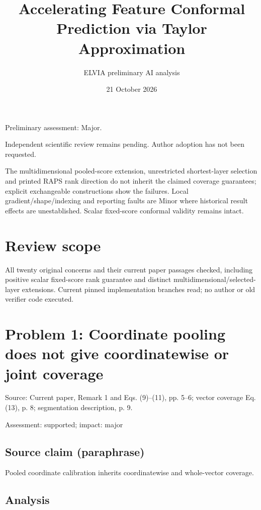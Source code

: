 \documentclass[11pt]{article}
\begin{document}
\title{Accelerating Feature Conformal Prediction via Taylor Approximation}

\author{ELVIA preliminary AI analysis}\date{21 October 2026}\maketitle

Preliminary assessment: Major.\par

Independent scientific review remains pending. Author adoption has not been requested.

The multidimensional pooled-score extension, unrestricted shortest-layer selection and printed RAPS rank direction do not inherit the claimed coverage guarantees; explicit exchangeable constructions show the failures. Local gradient/shape/indexing and reporting faults are Minor where historical result effects are unestablished. Scalar fixed-score conformal validity remains intact.

\section*{Review scope}

All twenty original concerns and their current paper passages checked, including positive scalar fixed-score rank guarantee and distinct multidimensional/selected-layer extensions. Current pinned implementation branches read; no author or old verifier code executed.

\section*{Problem 1: Coordinate pooling does not give coordinatewise or joint coverage}

Source: Current paper, Remark 1 and Eqs. (9)–(11), pp. 5–6; vector coverage Eq. (13), p. 8; segmentation description, p. 9.

Assessment: supported; impact: major

\subsection*{Source claim (paraphrase)}

Pooled coordinate calibration inherits coordinatewise and whole-vector coverage.

\subsection*{Analysis}
\end{document}
